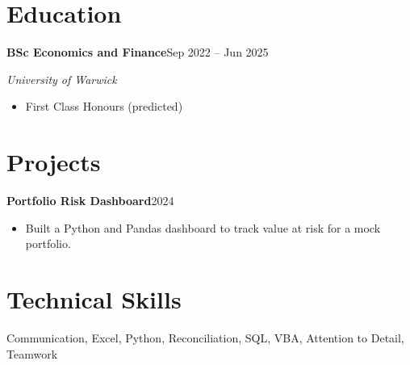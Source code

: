 \documentclass[11pt,a4paper]{article}
\begin{document}
\section*{Education}

\noindent\textbf{BSc Economics and Finance}\hfill{\small Sep 2022 -- Jun 2025}\par\nopagebreak
\noindent\textit{University of Warwick}\par
\begin{itemize}
  \item First Class Honours (predicted)
\end{itemize}

\section*{Projects}

\noindent\textbf{Portfolio Risk Dashboard}\hfill{\small 2024}\par\nopagebreak
\begin{itemize}
  \item Built a Python and Pandas dashboard to track value at risk for a mock portfolio.
\end{itemize}

\section*{Technical Skills}
\begin{flushleft}
Communication, Excel, Python, Reconciliation, SQL, VBA, Attention to Detail, Teamwork
\end{flushleft}
\end{document}
